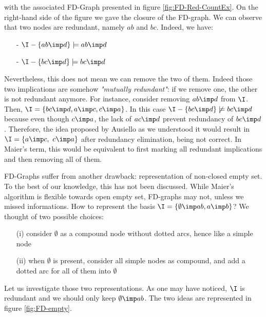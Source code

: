 with the associated FD-Graph presented in figure \ref{fig:FD-Red-CountEx}. On the right-hand side of the figure we gave the closure of the FD-graph. We can
observe that two nodes are redundant, namely $ab$ and $bc$. Indeed, we have:
\begin{itemize}
	\item[-] $\I - \{ab \imp d \} \models ab \imp d$
	\item[-] $\I - \{bc \imp d \} \models bc \imp d$
\end{itemize}
\noindent Nevertheless, this does not mean we can remove the two of them. Indeed
those two implications are somehow \textit{"mutually redundant"}: if we remove
one, the other is not redundant anymore. For instance, consider removing $ab \imp d$ from $\I$. Then, $\I = \{ bc \imp d, a \imp c, c \imp a \}$. In this
case $\I - \{bc \imp d \} \not\models bc \imp d$ because even though $c \imp a$,
the lack of $ac \imp d$ prevent redundancy of $bc \imp d$. Therefore, the idea
proposed by Ausiello as we understood it would result in $\I = \{ a \imp c, \ c \imp a \}$ after redundancy elimination, being not correct. In Maier's term, this would be equivalent to first marking all redundant implications and then
removing all of them.

\begin{figure}[ht]
	
\end{figure}

\vspace{1.2em}

FD-Graphs suffer from another drawback: representation of non-closed empty set.
To the best of our knowledge, this has not been discussed. While Maier's algorithm is flexible towards open empty set, FD-graphs may not, unless we missed informations. How to represent the basis $\I = \{ \emptyset \imp ab, a \imp b\}$? We thought of two possible choices:
\begin{itemize}
	\item[(i)] consider $\emptyset$ as a compound node without dotted arcs,
	hence like a simple node
	\item[(ii)] when $\emptyset$ is present, consider all simple nodes as 
	compound, and add a dotted arc for all of them into $\emptyset$
\end{itemize}
Let us investigate those two representations. As one may have noticed, $\I$
is redundant and we should only keep $\emptyset \imp ab$. The two ideas
are represented in figure \ref{fig:FD-empty}.

\begin{figure}[ht]
		
\end{figure}

